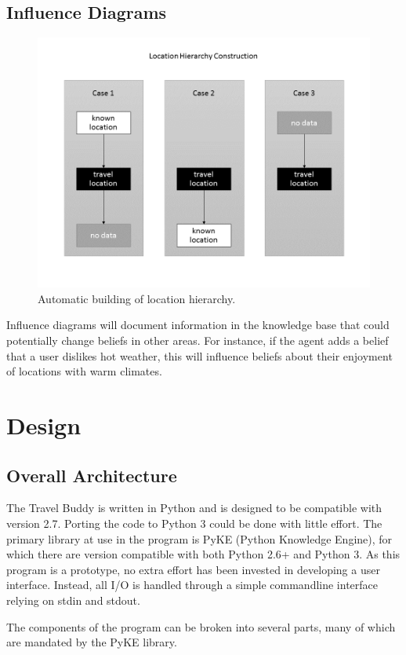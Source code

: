 \documentclass[11pt]{article} %
\begin{document}
\subsection{Influence Diagrams}
\begin{figure}
\centering
\includegraphics[width=12cm]{location_hierarchy.png}
\caption{Automatic building of location hierarchy.\label{fig:hierarchy1}}
\end{figure}
Influence diagrams will document information in the
knowledge base that could potentially change beliefs
in other areas. For instance, if the agent adds a belief
that a user dislikes hot weather, this will influence
beliefs about their enjoyment of locations with warm climates.

\section{Design}
\subsection{Overall Architecture}
The Travel Buddy is written in Python and is designed to be
compatible with version 2.7. Porting the code to
Python 3 could be done with little effort. The primary
library at use in the program is PyKE (Python Knowledge
Engine), for which there are version compatible with both
Python 2.6+ and Python 3. As this program is a prototype,
no extra effort has been invested in developing a
user interface. Instead, all I/O is handled through a simple
commandline interface relying on stdin and stdout.

The components of the program can be broken into several
parts, many of which are mandated by the PyKE library.
\end{document}
